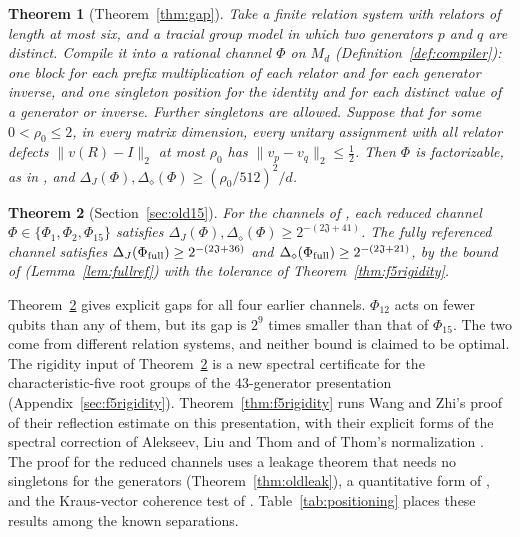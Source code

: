 \documentclass[11pt]{article}
\newtheorem{headline}{Theorem}
\newcommand{\cJ}{\mathfrak J}
\begin{document}
\begin{headline}[Theorem~\ref{thm:gap}]\label{hl:compiler}
Take a finite relation system with relators of length at most six, and a tracial group model in which two generators $p$ and $q$ are distinct.  Compile it into a rational channel $\Phi$ on $M_d$ (Definition~\ref{def:compiler}): one block for each prefix multiplication of each relator and for each generator inverse, and one singleton position for the identity and for each distinct value of a generator or inverse.  Further singletons are allowed.  Suppose that for some $0<\rho_0\le2$, in every matrix dimension, every unitary assignment with all relator defects $\|v(R)-I\|_2$ at most $\rho_0$ has $\|v_p-v_q\|_2\le\tfrac12$.  Then $\Phi$ is factorizable, as in \cite[Proposition~3]{MghirbiDouglasV1}, and $\Delta_J(\Phi),\Delta_\diamond(\Phi)\ge(\rho_0/512)^2/d$.
\end{headline}

\begin{headline}[Section~\ref{sec:old15}]\label{hl:v1}
For the channels of \cite{MghirbiDouglasV1}, each reduced channel $\Phi\in\{\Phi_1,\Phi_2,\Phi_{15}\}$ satisfies $\Delta_J(\Phi),\Delta_\diamond(\Phi)\ge2^{-(2\cJ+41)}$.  The fully referenced channel satisfies $\Delta_J(\Phi_{\rm full})\ge2^{-(2\cJ+36)}$ and $\Delta_\diamond(\Phi_{\rm full})\ge2^{-(2\cJ+21)}$, by the bound of \cite[Theorem~6]{MghirbiDouglasV1} (Lemma~\ref{lem:fullref}) with the tolerance of Theorem~\ref{thm:f5rigidity}.
\end{headline}

Theorem~\ref{hl:v1} gives explicit gaps for all four earlier channels.  $\Phi_{12}$ acts on fewer qubits than any of them, but its gap is $2^9$ times smaller than that of $\Phi_{15}$.  The two come from different relation systems, and neither bound is claimed to be optimal.  The rigidity input of Theorem~\ref{hl:v1} is a new spectral certificate for the characteristic-five root groups of the $43$-generator presentation (Appendix~\ref{sec:f5rigidity}).  Theorem~\ref{thm:f5rigidity} runs Wang and Zhi's proof of their reflection estimate \cite[Theorem~5.2]{WangZhi26} on this presentation, with their explicit forms of the spectral correction of Alekseev, Liu and Thom and of Thom's normalization \cite[Corollary~4.3 and Theorem~4.1]{WangZhi26}.  The proof for the reduced channels uses a leakage theorem that needs no singletons for the generators (Theorem~\ref{thm:oldleak}), a quantitative form of \cite[Lemma~2]{MghirbiDouglasV1}, and the Kraus-vector coherence test of \cite[Theorem~5]{MghirbiDouglasV1}.  Table~\ref{tab:positioning} places these results among the known separations.
\end{document}
